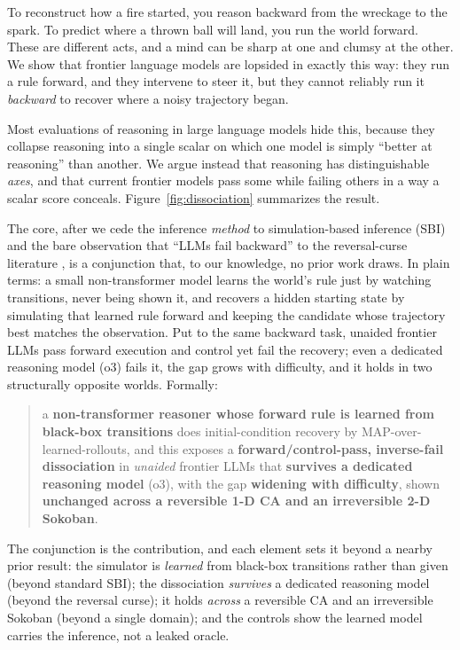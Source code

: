 \documentclass{article}
\begin{document}


To reconstruct how a fire started, you reason backward from the wreckage to the spark. To predict
where a thrown ball will land, you run the world forward. These are different acts, and a mind can
be sharp at one and clumsy at the other. We show that frontier language models are lopsided in
exactly this way: they run a rule forward, and they intervene to steer it, but they cannot reliably
run it \emph{backward} to recover where a noisy trajectory began.

Most evaluations of reasoning in large language models hide this, because they collapse reasoning
into a single scalar on which one model is simply ``better at reasoning'' than another. We argue
instead that reasoning has distinguishable \emph{axes}, and that current frontier models pass some
while failing others in a way a scalar score conceals. Figure~\ref{fig:dissociation} summarizes the
result.

The core, after we cede the inference \emph{method} to simulation-based inference (SBI)
\cite{sbi2020} and the bare observation that ``LLMs fail backward'' to the reversal-curse literature
\cite{reversalcurse}, is a conjunction that, to our knowledge, no prior work draws. In plain terms: a
small non-transformer model learns the world's rule just by watching transitions, never being shown
it, and recovers a hidden starting state by simulating that learned rule forward and keeping the
candidate whose trajectory best matches the observation. Put to the same backward task, unaided
frontier LLMs pass forward execution and control yet fail the recovery; even a dedicated reasoning
model (o3) fails it, the gap grows with difficulty, and it holds in two structurally opposite worlds.
Formally:

\begin{quote}
a \textbf{non-transformer reasoner whose forward rule is learned from black-box transitions}
does initial-condition recovery by MAP-over-learned-rollouts, and this exposes a
\textbf{forward/control-pass, inverse-fail dissociation} in \emph{unaided} frontier LLMs that
\textbf{survives a dedicated reasoning model} (o3), with the gap \textbf{widening with
difficulty}, shown \textbf{unchanged across a reversible 1-D CA and an irreversible 2-D
Sokoban}.
\end{quote}

The conjunction is the contribution, and each element sets it beyond a nearby prior result: the
simulator is \emph{learned} from black-box transitions rather than given (beyond standard SBI); the
dissociation \emph{survives} a dedicated reasoning model (beyond the reversal curse); it holds
\emph{across} a reversible CA and an irreversible Sokoban (beyond a single domain); and the controls
show the learned model carries the inference, not a leaked oracle.
\end{document}
